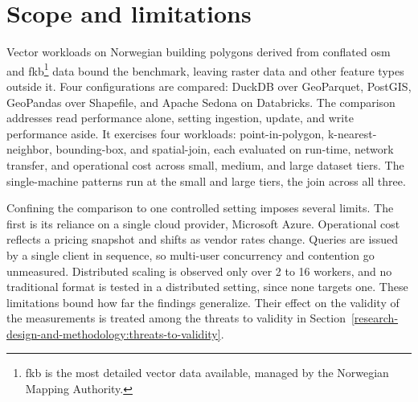 \section{Scope and limitations}
\label{introduction:scope-and-limitations}
Vector workloads on Norwegian building polygons derived from conflated \acrfull{osm} and \acrfull{fkb}\footnote{\acrshort{fkb} is the most detailed vector data available, managed by the Norwegian Mapping Authority.} data bound the benchmark, leaving raster data and other feature types outside it. Four configurations are compared: DuckDB over GeoParquet, PostGIS, GeoPandas over Shapefile, and Apache Sedona on Databricks. The comparison addresses read performance alone, setting ingestion, update, and write performance aside. It exercises four workloads: point-in-polygon, k-nearest-neighbor, bounding-box, and spatial-join, each evaluated on run-time, network transfer, and operational cost across small, medium, and large dataset tiers. The single-machine patterns run at the small and large tiers, the join across all three.

Confining the comparison to one controlled setting imposes several limits. The first is its reliance on a single cloud provider, Microsoft Azure. Operational cost reflects a pricing snapshot and shifts as vendor rates change. Queries are issued by a single client in sequence, so multi-user concurrency and contention go unmeasured. Distributed scaling is observed only over 2 to 16 workers, and no traditional format is tested in a distributed setting, since none targets one. These limitations bound how far the findings generalize. Their effect on the validity of the measurements is treated among the threats to validity in Section~\ref{research-design-and-methodology:threats-to-validity}.